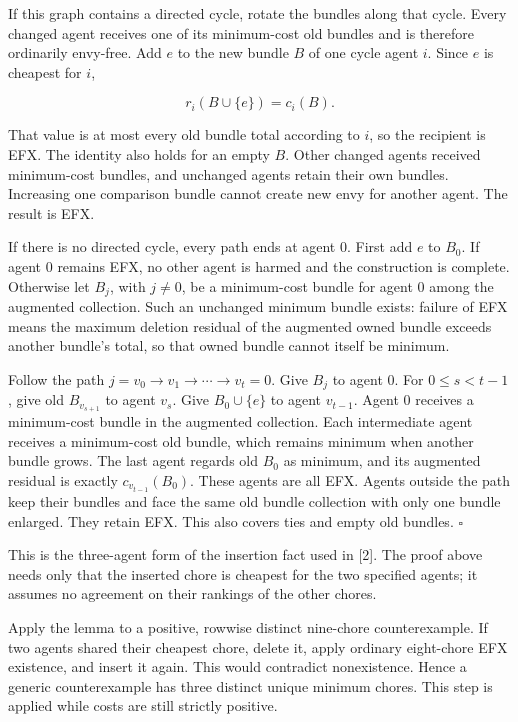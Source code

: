 \documentclass[
  11pt,
]{article}
\newcounter{none} %
\begin{document}
If this graph contains a directed cycle, rotate the bundles along that
cycle. Every changed agent receives one of its minimum-cost old bundles
and is therefore ordinarily envy-free. Add \(e\) to the new bundle \(B\)
of one cycle agent \(i\). Since \(e\) is cheapest for \(i\),

\[
r_i(B\cup\{e\})=c_i(B).
\]

That value is at most every old bundle total according to \(i\), so the
recipient is EFX. The identity also holds for an empty \(B\). Other
changed agents received minimum-cost bundles, and unchanged agents
retain their own bundles. Increasing one comparison bundle cannot create
new envy for another agent. The result is EFX.

If there is no directed cycle, every path ends at agent 0. First add
\(e\) to \(B_0\). If agent 0 remains EFX, no other agent is harmed and
the construction is complete. Otherwise let \(B_j\), with \(j\ne0\), be
a minimum-cost bundle for agent 0 among the augmented collection. Such
an unchanged minimum bundle exists: failure of EFX means the maximum
deletion residual of the augmented owned bundle exceeds another bundle's
total, so that owned bundle cannot itself be minimum.

Follow the path \(j=v_0\to v_1\to\cdots\to v_t=0\). Give \(B_j\) to
agent 0. For \(0\le s<t-1\), give old \(B_{v_{s+1}}\) to agent \(v_s\).
Give \(B_0\cup\{e\}\) to agent \(v_{t-1}\). Agent 0 receives a
minimum-cost bundle in the augmented collection. Each intermediate agent
receives a minimum-cost old bundle, which remains minimum when another
bundle grows. The last agent regards old \(B_0\) as minimum, and its
augmented residual is exactly \(c_{v_{t-1}}(B_0)\). These agents are all
EFX. Agents outside the path keep their bundles and face the same old
bundle collection with only one bundle enlarged. They retain EFX. This
also covers ties and empty old bundles. \(\square\)

This is the three-agent form of the insertion fact used in {[}2{]}. The
proof above needs only that the inserted chore is cheapest for the two
specified agents; it assumes no agreement on their rankings of the other
chores.

Apply the lemma to a positive, rowwise distinct nine-chore
counterexample. If two agents shared their cheapest chore, delete it,
apply ordinary eight-chore EFX existence, and insert it again. This
would contradict nonexistence. Hence a generic counterexample has three
distinct unique minimum chores. This step is applied while costs are
still strictly positive.
\end{document}
